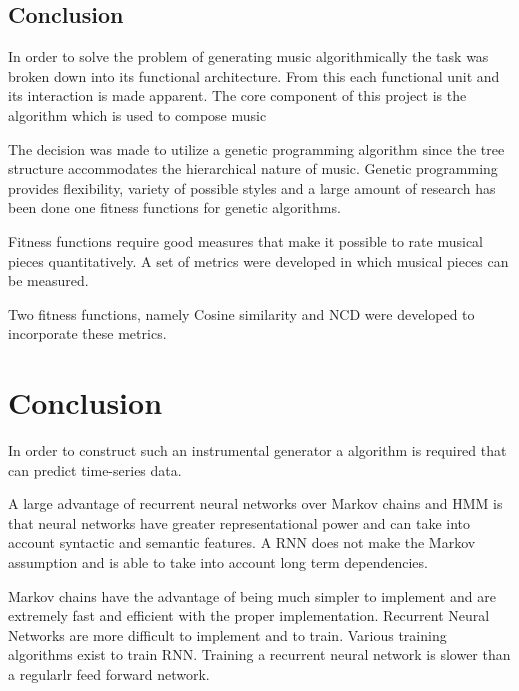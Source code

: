 \section{Conclusion}
In order to solve the problem of generating music algorithmically the task was broken down into its functional architecture. From this each functional unit and its interaction is made apparent. The core component of this project is the algorithm which is used to compose music

The decision was made to utilize a genetic programming algorithm since the tree structure accommodates the hierarchical nature of music. Genetic programming provides flexibility, variety of possible styles and a large amount of research has been done one fitness functions for genetic algorithms.

Fitness functions require good measures that make it possible to rate musical pieces quantitatively. A set of metrics were developed in which musical pieces can be measured.

Two fitness functions, namely Cosine similarity and \ac{NCD} were developed to incorporate these metrics.


\chapter{Conclusion}

In order to construct such an instrumental generator a algorithm is required that can predict time-series data.

A large advantage of recurrent neural networks over Markov chains and \ac{HMM} is that neural networks have greater representational power and can take into account syntactic and semantic features. A RNN does not make the Markov assumption and is able to take into account long term dependencies.

Markov chains have the advantage of being much simpler to implement and are extremely fast and efficient with the proper implementation. 
Recurrent Neural Networks are more difficult to implement and to train. Various training algorithms exist to train RNN. Training a recurrent neural network is slower than a regularlr feed forward network.
